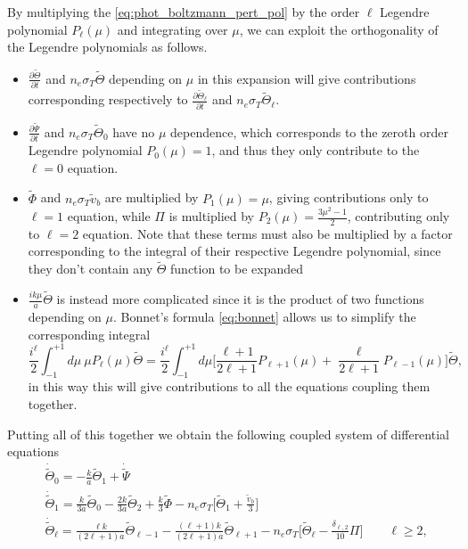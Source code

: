 By multiplying the \eqref{eq:phot_boltzmann_pert_pol} by the order $\ell$ Legendre polynomial $P_\ell(\mu)$ and integrating over $\mu$, we can exploit the orthogonality of the Legendre polynomials as follows.
\begin{itemize}
    \item $\frac{\partial \tilde\Theta}{\partial t} $ and $n_e\sigma_T\tilde{\Theta}$ depending on $\mu$ in this expansion will give contributions corresponding respectively to $\frac{\partial \tilde\Theta_\ell}{\partial t} $ and $n_e\sigma_T\tilde{\Theta}_\ell$.
    \item $\frac{\partial\tilde\Psi}{\partial t}$ and $n_e\sigma_T\tilde\Theta_0$ have no $\mu$ dependence, which corresponds to the zeroth order Legendre polynomial $P_0(\mu)=1$, and thus they only contribute to the $\ell=0$ equation.
    \item $\tilde\Phi$ and $n_e\sigma_T\tilde v_b$ are multiplied by $P_1(\mu)=\mu$, giving contributions only to $\ell=1$ equation, while $\Pi$ is multiplied by $P_2(\mu)=\frac{3\mu^2-1}{2}$, contributing only to $\ell=2$ equation. Note that these terms must also be multiplied by a factor corresponding to the integral of their respective Legendre polynomial, since they don't contain any $\tilde\Theta$ function to be expanded 
    \item $\frac{ik\mu}{a}\tilde\Theta$ is instead more complicated since it is the product of two functions depending on $\mu$. Bonnet's formula \eqref{eq:bonnet} allows us to simplify the corresponding integral 
    $$\frac{i^\ell}{2}\int_{-1}^{+1}d\mu\ \mu P_\ell(\mu)\tilde\Theta=\frac{i^\ell}{2}\int_{-1}^{+1}d\mu \bigg[\frac{\ell+1}{2\ell+1}P_{\ell+1}(\mu)+\frac{\ell}{2\ell+1}P_{\ell-1}(\mu)\bigg]\tilde\Theta,$$
    in this way this will give contributions to all the equations coupling them together.
\end{itemize}
Putting all of this together we obtain the following coupled system of differential equations
\begin{subequations}\label{eq:multipole_boltzmann_photons}
    \begin{align}
           &\dot{\tilde{\Theta}}_0=-\frac{k}{a}\tilde{\Theta}_1+\dot{\tilde\Psi}\label{eq:multipole_boltzmann_photons_0}\\
            &\dot{\tilde{\Theta}}_1=\frac{k}{3a}\tilde\Theta_0-\frac{2k}{3a}\tilde\Theta_2+\frac{k}{3}\tilde\Phi-n_e\sigma_T\bigg[\tilde\Theta_1+\frac{\tilde v_b}{3}\bigg]\label{eq:multipole_boltzmann_photons_2}\\
            &\dot{\tilde{\Theta}}_\ell=\frac{\ell k}{(2\ell+1)a}\tilde\Theta_{\ell-1}-\frac{(\ell+1)k}{(2\ell+1)a}\tilde\Theta_{\ell+1}-n_e\sigma_T\bigg[\tilde\Theta_\ell-\frac{\delta_{\ell,2}}{10}\Pi\bigg]\qquad \ell\geq 2,\label{eq:multipole_boltzmann_photons_3}
        \end{align}
\end{subequations}


